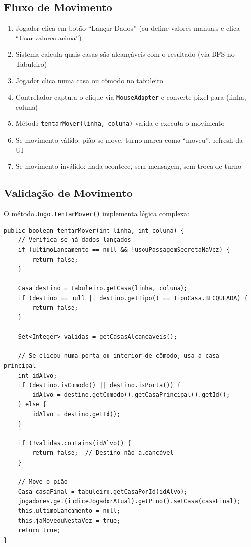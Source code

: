 \documentclass[12pt,a4paper]{report}
\begin{document}
\subsection{Fluxo de Movimento}

\begin{enumerate}
    \item Jogador clica em botão ``Lançar Dados'' (ou define valores manuais e clica ``Usar valores acima'')
    \item Sistema calcula quais casas são alcançáveis com o resultado (via BFS no Tabuleiro)
    \item Jogador clica numa casa ou cômodo no tabuleiro
    \item Controlador captura o clique via \texttt{MouseAdapter} e converte pixel para (linha, coluna)
    \item Método \texttt{tentarMover(linha, coluna)} valida e executa o movimento
    \item Se movimento válido: pião se move, turno marca como ``moveu'', refresh da UI
    \item Se movimento inválido: nada acontece, sem mensagem, sem troca de turno
\end{enumerate}

\subsection{Validação de Movimento}

O método \texttt{Jogo.tentarMover()} implementa lógica complexa:

\begin{lstlisting}
public boolean tentarMover(int linha, int coluna) {
    // Verifica se há dados lançados
    if (ultimoLancamento == null && !usouPassagemSecretaNaVez) {
        return false;
    }

    Casa destino = tabuleiro.getCasa(linha, coluna);
    if (destino == null || destino.getTipo() == TipoCasa.BLOQUEADA) {
        return false;
    }

    Set<Integer> validas = getCasasAlcancaveis();

    // Se clicou numa porta ou interior de cômodo, usa a casa principal
    int idAlvo;
    if (destino.isComodo() || destino.isPorta()) {
        idAlvo = destino.getComodo().getCasaPrincipal().getId();
    } else {
        idAlvo = destino.getId();
    }

    if (!validas.contains(idAlvo)) {
        return false;  // Destino não alcançável
    }

    // Move o pião
    Casa casaFinal = tabuleiro.getCasaPorId(idAlvo);
    jogadores.get(indiceJogadorAtual).getPino().setCasa(casaFinal);
    this.ultimoLancamento = null;
    this.jaMoveouNestaVez = true;
    return true;
}
\end{lstlisting}
\end{document}
